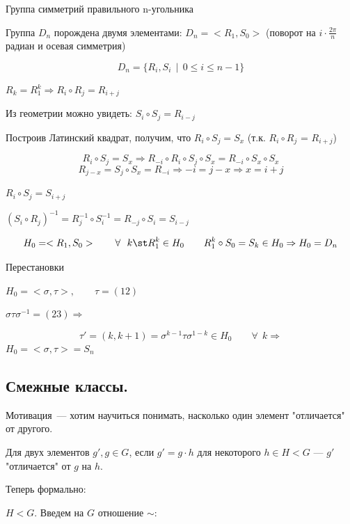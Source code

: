 \begin{Example}{Группа симметрий правильного n-угольника}{}

    Группа $D_n$ порождена двумя элементами: $D_n = <R_1, S_0>$ (поворот на $i\cdot \frac{2\pi}{n}$ радиан и осевая симметрия)

    \[   
    D_n = \{ R_i, S_i \ \ | \ \ 0 \le i \le n-1 \}
    \]

    $R_k = R^k_1 \Rightarrow R_i \circ R_j = R_{i+j}$

    Из геометрии можно увидеть: $S_i \circ S_j = R_{i-j}$

    Построив Латинский квадрат, получим, что $R_i \circ S_j = S_x$ (т.к. $R_i \circ R_j$ = $R_{i+j}$)
    
    \[  
    R_i \circ S_j = S_x \Rightarrow R_{-i} \circ R_i \circ S_j \circ S_x = R_{-i} \circ S_x \circ S_x
    \]
    \[
    R_{j-x} = S_j \circ S_x = R_{-i} \Rightarrow -i = j - x \Rightarrow x = i +j
    \]

    $R_i \circ S_j = S_{i+j}$

    $(S_i \circ R_j)^{-1} = R^{-1}_j \circ S^{-1}_i = R_{-j} \circ S_i = S_{i-j}$
    
    \[ H_0 = <R_1, S_0> \qquad \forall \ \ k \st R^k_1 \in H_0 \qquad R^k_1\circ S_0 = S_k \in H_0 \Rightarrow H_0 = D_n \]
\end{Example}

\begin{Example}{Перестановки}{}

    $H_0 = <\sigma, \tau>, \qquad \tau = (12)$

    $\sigma \tau \sigma^{-1} = (23)\Rightarrow$

    \[ \tau' = (k, k+1) = \sigma^{k-1}\tau \sigma^{1-k} \in H_0 \qquad \forall \ \ k \Rightarrow \]
    $H_0 = <\sigma, \tau> = S_n$
\end{Example}

\subsection{Смежные классы.}

Мотивация~--- хотим научиться понимать, насколько один элемент "отличается" от другого.

Для двух элементов $g', g \in G$, если $g' = g \cdot h$ для некоторого $h \in H < G$ --- $g'$ "отличается" от $g$ на $h$.

Теперь формально:

$H < G$. Введем на $G$ отношение $\sim$:


